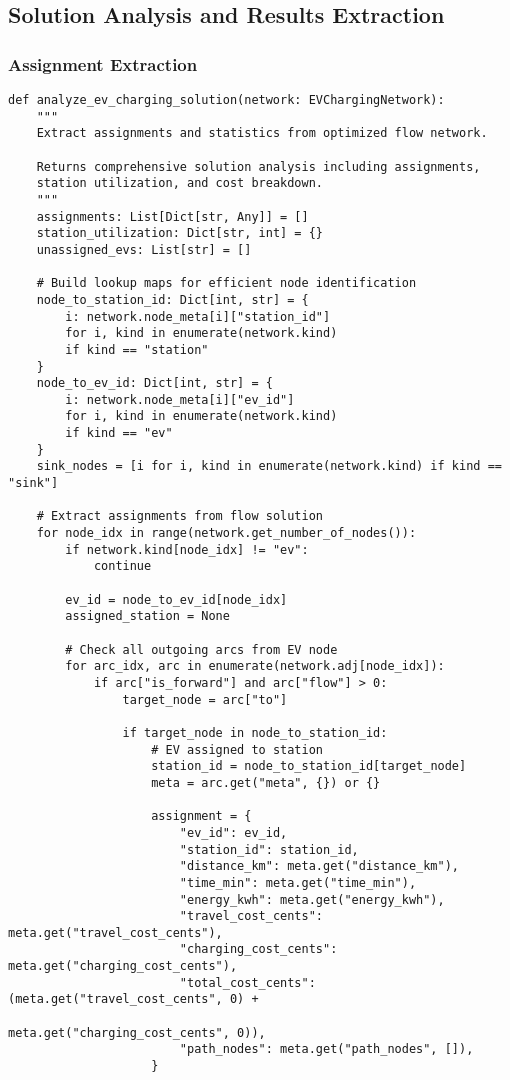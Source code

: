 \documentclass[12pt,a4paper]{article}
\begin{document}
\subsection{Solution Analysis and Results Extraction}

\subsubsection{Assignment Extraction}

\begin{lstlisting}[caption=Solution Analysis and Assignment Extraction]
def analyze_ev_charging_solution(network: EVChargingNetwork):
    """
    Extract assignments and statistics from optimized flow network.
    
    Returns comprehensive solution analysis including assignments,
    station utilization, and cost breakdown.
    """
    assignments: List[Dict[str, Any]] = []
    station_utilization: Dict[str, int] = {}
    unassigned_evs: List[str] = []
    
    # Build lookup maps for efficient node identification
    node_to_station_id: Dict[int, str] = {
        i: network.node_meta[i]["station_id"] 
        for i, kind in enumerate(network.kind) 
        if kind == "station"
    }
    node_to_ev_id: Dict[int, str] = {
        i: network.node_meta[i]["ev_id"] 
        for i, kind in enumerate(network.kind) 
        if kind == "ev"
    }
    sink_nodes = [i for i, kind in enumerate(network.kind) if kind == "sink"]
    
    # Extract assignments from flow solution
    for node_idx in range(network.get_number_of_nodes()):
        if network.kind[node_idx] != "ev":
            continue
        
        ev_id = node_to_ev_id[node_idx]
        assigned_station = None
        
        # Check all outgoing arcs from EV node
        for arc_idx, arc in enumerate(network.adj[node_idx]):
            if arc["is_forward"] and arc["flow"] > 0:
                target_node = arc["to"]
                
                if target_node in node_to_station_id:
                    # EV assigned to station
                    station_id = node_to_station_id[target_node]
                    meta = arc.get("meta", {}) or {}
                    
                    assignment = {
                        "ev_id": ev_id,
                        "station_id": station_id,
                        "distance_km": meta.get("distance_km"),
                        "time_min": meta.get("time_min"),
                        "energy_kwh": meta.get("energy_kwh"),
                        "travel_cost_cents": meta.get("travel_cost_cents"),
                        "charging_cost_cents": meta.get("charging_cost_cents"),
                        "total_cost_cents": (meta.get("travel_cost_cents", 0) + 
                                           meta.get("charging_cost_cents", 0)),
                        "path_nodes": meta.get("path_nodes", []),
                    }
                    

\end{lstlisting}
\end{document}
